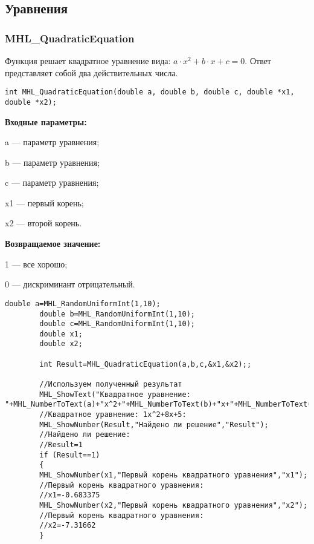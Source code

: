 \documentclass[a4paper,12pt]{article}
\begin{document}
\subsection{Уравнения}

\subsubsection{MHL\_QuadraticEquation}\label{MHL_QuadraticEquation}

Функция решает квадратное уравнение вида: $a\cdot x^2+b\cdot x+c=0$. Ответ представляет собой два действительных числа.


\begin{lstlisting}[label=code_syntax_MHL_QuadraticEquation,caption=Синтаксис]
int MHL_QuadraticEquation(double a, double b, double c, double *x1, double *x2);
\end{lstlisting}

\textbf{Входные параметры:}
 
a --- параметр уравнения;
 
b --- параметр уравнения;
 
c --- параметр уравнения;
 
x1 --- первый корень;
 
x2 --- второй корень.

\textbf{Возвращаемое значение:}
 
1 --- все хорошо;
 
0 --- дискриминант отрицательный.



\begin{lstlisting}[label=code_use_MHL_QuadraticEquation,caption=Пример использования]
        double a=MHL_RandomUniformInt(1,10);
        double b=MHL_RandomUniformInt(1,10);
        double c=MHL_RandomUniformInt(1,10);
        double x1;
        double x2;

        int Result=MHL_QuadraticEquation(a,b,c,&x1,&x2);;

        //Используем полученный результат
        MHL_ShowText("Квадратное уравнение: "+MHL_NumberToText(a)+"x^2+"+MHL_NumberToText(b)+"x+"+MHL_NumberToText(c)+"=0");
        //Квадратное уравнение: 1x^2+8x+5:
        MHL_ShowNumber(Result,"Найдено ли решение","Result");
        //Найдено ли решение:
        //Result=1
        if (Result==1)
        {
        MHL_ShowNumber(x1,"Первый корень квадратного уравнения","x1");
        //Первый корень квадратного уравнения:
        //x1=-0.683375
        MHL_ShowNumber(x2,"Первый корень квадратного уравнения","x2");
        //Первый корень квадратного уравнения:
        //x2=-7.31662
        }
\end{lstlisting}

\newpage
\end{document}
